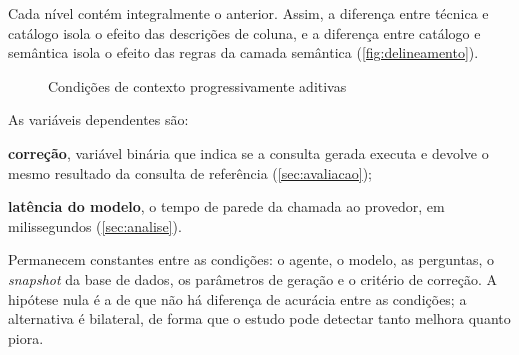 Cada nível contém integralmente o anterior. Assim, a diferença entre
técnica e catálogo isola o efeito das descrições de coluna, e a diferença
entre catálogo e semântica isola o efeito das regras da camada semântica
(\autoref{fig:delineamento}).

\begin{figure}[htb]
  \centering
  \caption{Condições de contexto progressivamente aditivas}
  \label{fig:delineamento}
\end{figure}

As variáveis dependentes são:
\begin{alineas}
  \item \textbf{correção}, variável binária que indica se a consulta gerada
        executa e devolve o mesmo resultado da consulta de referência
        (\autoref{sec:avaliacao});
  \item \textbf{latência do modelo}, o tempo de parede da chamada ao
        provedor, em milissegundos (\autoref{sec:analise}).
\end{alineas}

Permanecem constantes entre as condições: o agente, o modelo, as perguntas,
o \textit{snapshot} da base de dados, os parâmetros de geração e o critério
de correção. A hipótese nula é a de que não há diferença de acurácia entre
as condições; a alternativa é bilateral, de forma que o estudo pode detectar
tanto melhora quanto piora.

